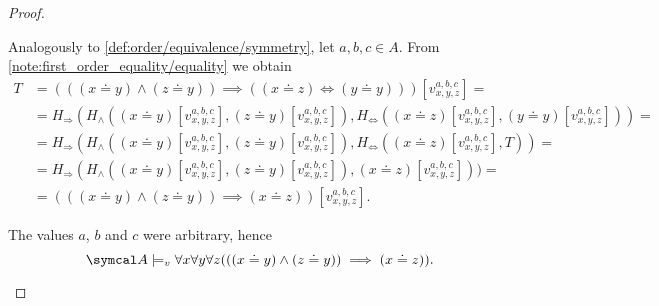 \begin{proof}
\begin{description}
     Analogously to \ref{def:order/equivalence/symmetry}, let \( a, b, c \in A \). From \cref{note:first_order_equality/equality} we obtain
    \begin{align*}
      T &=
      (((x \doteq y) \land (z \doteq y)) \implies ((x \doteq z) \iff (y \doteq y)))[v_{x,y,z}^{a,b,c}]
      = \\ &=
      H_\Rightarrow(H_\land((x \doteq y)[v_{x,y,z}^{a,b,c}], (z \doteq y)[v_{x,y,z}^{a,b,c}]), H_\Leftrightarrow((x \doteq z)[v_{x,y,z}^{a,b,c}], (y \doteq y)[v_{x,y,z}^{a,b,c}]))
      = \\ &=
      H_\Rightarrow(H_\land((x \doteq y)[v_{x,y,z}^{a,b,c}], (z \doteq y)[v_{x,y,z}^{a,b,c}]), H_\Leftrightarrow((x \doteq z)[v_{x,y,z}^{a,b,c}], T))
      = \\ &=
      H_\Rightarrow(H_\land((x \doteq y)[v_{x,y,z}^{a,b,c}], (z \doteq y)[v_{x,y,z}^{a,b,c}]), (x \doteq z)[v_{x,y,z}^{a,b,c}]))
      = \\ &=
      (((x \doteq y) \land (z \doteq y)) \implies (x \doteq z))[v_{x,y,z}^{a,b,c}].
    \end{align*}

    The values \( a \), \( b \) and \( c \) were arbitrary, hence
    \begin{equation*}
      \Cal{A} \models_v \forall x \forall y \forall z (((x \doteq y) \land (z \doteq y)) \implies (x \doteq z)).
    \end{equation*}
  \end{description}
\end{proof}
